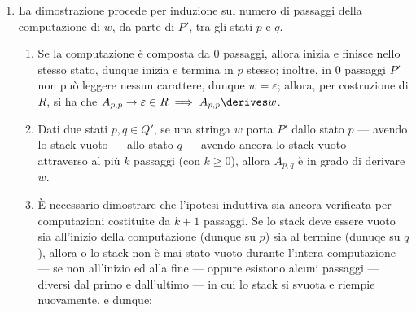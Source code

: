 \documentclass[a4paper, 12pt]{report}
\begin{document}
{\begin{enumerate}[label=]
\begin{enumerate}[label=]
\begin{itemize}
                                allora $w$ è in grado di portare $P'$ dallo stato $p$ allo stato $q$, lasciando invariato lo stack.
                            \item differentemente, nel secondo caso, siano $y$ e $z$ sottostringhe di $w$ generate rispettivamente da $A_{p, r}$ ed $A_{r, q}$ dunque $\soe{l}{A_{p,r} \derives y \\ A_{r,q} \derives z} \implies w = yz$, e si noti che $y$ e $z$ sono state derivate con $k$ passaggi; allora, per ipotesi induttiva forte, $y$ e $z$ portano, rispettivamente, $P'$ dagli stati $p$ ed $r$ --- avendo lo stack vuoto --- agli stati $r$ e $q$ --- avendo ancora lo stack vuoto; allora, $w$ è in grado di portare $P'$ dallo stato $p$ allo stato $q$, lasciando invariato lo stack;
                        \end{itemize}
                \end{enumerate}
            \item {} La dimostrazione procede per induzione sul numero di passaggi della computazione di $w$, da parte di $P'$, tra gli stati $p$ e $q$.
                \begin{enumerate}[label=]
                    \item {} Se la computazione è composta da 0 passaggi, allora inizia e finisce nello stesso stato, dunque inizia e termina in $p$ stesso; inoltre, in 0 passaggi $P'$ non può leggere nessun carattere, dunque $w = \varepsilon$; allora, per costruzione di $R$, si ha che $A_{p,p} \to \varepsilon \in R \implies A_{p,p} \derives w$.
                    \item {} Dati due stati $p, q \in Q'$, se una stringa $w$ porta $P'$ dallo stato $p$ --- avendo lo stack vuoto --- allo stato $q$ --- avendo ancora lo stack vuoto --- attraverso al più $k$ passaggi (con $k \ge 0$), allora $A_{p,q}$ è in grado di derivare $w$.
                    \item {} È necessario dimostrare che l'ipotesi induttiva sia ancora verificata per computazioni costituite da $k + 1$ passaggi. Se lo stack deve essere vuoto sia all'inizio della computazione (dunque su $p$) sia al termine (dunuqe su $q$), allora o lo stack non è mai stato vuoto durante l'intera computazione --- se non all'inizio ed alla fine --- oppure esistono alcuni passaggi --- diversi dal primo e dall'ultimo --- in cui lo stack si svuota e riempie nuovamente, e dunque:


\end{enumerate}
\end{enumerate}}
\end{document}
